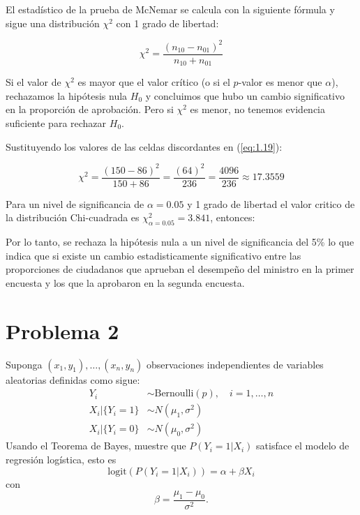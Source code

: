 \newpage
El estadístico de la prueba de McNemar se calcula con la siguiente fórmula y sigue una distribución $\chi^2$ con 1 grado de libertad:

\begin{equation}
    \chi^2 = \frac{(n_{10} - n_{01})^2}{n_{10} + n_{01}}
    \label{eq:1.19}
\end{equation}

Si el valor de $\chi^2$ es mayor que el valor crítico (o si el $p$-valor es menor que $\alpha$), rechazamos la hipótesis nula $H_0$ y concluimos que hubo un cambio significativo en la proporción de aprobación. Pero si $\chi^2$ es menor, no tenemos evidencia suficiente para rechazar $H_0$.

Sustituyendo los valores de las celdas discordantes en (\ref{eq:1.19}):

\begin{equation*}
    \chi^2 = \frac{(150 - 86)^2}{150 + 86} = \frac{(64)^2}{236} = \frac{4096}{236}\approx 17.3559
\end{equation*}

Para un nivel de significancia de $\alpha=0.05$ y 1 grado de libertad el valor critico de la distribución Chi-cuadrada es $\chi^2_{\alpha=0.05}=3.841$, entonces:

\begin{center}
\end{center}

Por lo tanto, se rechaza la hipótesis nula a un nivel de significancia del 5\% lo que indica que si existe un cambio estadisticamente significativo entre las proporciones de ciudadanos que aprueban el desempeño del ministro en la primer encuesta y los que la aprobaron en la segunda encuesta.

\newpage

\section*{Problema \textcolor{CIMATRed}{2}}

Suponga $(x_1, y_1), \dots, (x_n, y_n)$ observaciones independientes de variables aleatorias definidas como sigue:
\begin{align*}
    Y_i & \sim \text{Bernoulli}(p), \quad i = 1, \dots, n \\
    X_i | \{Y_i = 1\} & \sim N(\mu_1, \sigma^2) \\
    X_i | \{Y_i = 0\} & \sim N(\mu_0, \sigma^2)
\end{align*}
Usando el Teorema de Bayes, muestre que $P(Y_i = 1|X_i)$ satisface el modelo de regresión logística, esto es
\[
\text{logit}\left( P(Y_i = 1|X_i) \right) = \alpha + \beta X_i
\]
con
\[
\beta = \frac{\mu_1 - \mu_0}{\sigma^2}.
\]

